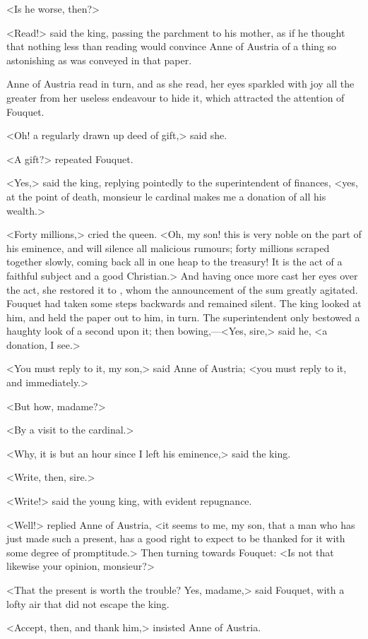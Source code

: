 <Is he worse, then?>

<Read!> said the king, passing the parchment to his mother, as if he thought that nothing less than reading would convince Anne of Austria of a thing so astonishing as was conveyed in that paper.

Anne of Austria read in turn, and as she read, her eyes sparkled with joy all the greater from her useless endeavour to hide it, which attracted the attention of Fouquet.

<Oh! a regularly drawn up deed of gift,> said she.

<A gift?> repeated Fouquet.

<Yes,> said the king, replying pointedly to the superintendent of finances, <yes, at the point of death, monsieur le cardinal makes me a donation of all his wealth.>

<Forty millions,> cried the queen. <Oh, my son! this is very noble on the part of his eminence, and will silence all malicious rumours; forty millions scraped together slowly, coming back all in one heap to the treasury! It is the act of a faithful subject and a good Christian.> And having once more cast her eyes over the act, she restored it to , whom the announcement of the sum greatly agitated. Fouquet had taken some steps backwards and remained silent. The king looked at him, and held the paper out to him, in turn. The superintendent only bestowed a haughty look of a second upon it; then bowing,—<Yes, sire,> said he, <a donation, I see.>

<You must reply to it, my son,> said Anne of Austria; <you must reply to it, and immediately.>

<But how, madame?>

<By a visit to the cardinal.>

<Why, it is but an hour since I left his eminence,> said the king.

<Write, then, sire.>

<Write!> said the young king, with evident repugnance.

<Well!> replied Anne of Austria, <it seems to me, my son, that a man who has just made such a present, has a good right to expect to be thanked for it with some degree of promptitude.> Then turning towards Fouquet: <Is not that likewise your opinion, monsieur?>

<That the present is worth the trouble? Yes, madame,> said Fouquet, with a lofty air that did not escape the king.

<Accept, then, and thank him,> insisted Anne of Austria.

